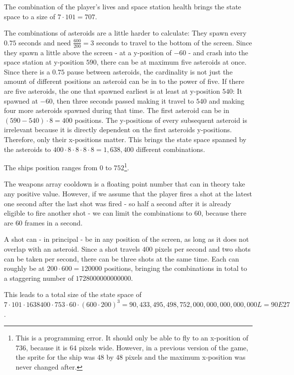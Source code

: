 \documentclass[a4paper,10pt]{article}
\begin{document}
The combination of the player's lives and space station health brings the state space to a size of $7 \cdot 101 = 707$.

The combinations of asteroids are a little harder to calculate: They spawn every $0.75$ seconds and need $\frac{600}{200} = 3$ seconds to travel to the bottom of the screen.
Since they spawn a little above the screen - at a y-position of $-60$ -  and crash into the space station at y-position $590$, there can be at maximum five asteroids at once.
Since there is a $0.75$ pause between asteroids, the cardinality is not just the amount of different positions an asteroid can be in to the power of five.
If there are five asteroids, the one that spawned earliest is at least at y-position $540$: It spawned at $-60$, then three seconds passed making it travel to $540$ and making four more asteroids spawned during that time.
The first asteroid can be in $(590-540)\cdot8 = 400$ positions.
The y-positions of every subsequent asteroid is irrelevant because it is directly dependent on the first asteroids y-positions.
Therefore, only their x-positions matter.
This brings the state space spanned by the asteroids to $400\cdot8\cdot8\cdot8\cdot8 = 1,638,400$ different combinations.

The ships position ranges from $0$ to $752$\footnote{This is a programming error. It should only be able to fly to an x-position of $736$, because it is $64$ pixels wide. However, in a previous version of the game, the sprite for the ship was $48$ by $48$ pixels and the maximum x-position was never changed after.}.

The weapons array cooldown is a floating point number that can in theory take any positive value.
However, if we assume that the player fires a shot at the latest one second after the last shot was fired - so half a second after it is already eligible to fire another shot - we can limit the combinations to $60$, because there are $60$ frames in a second.

A shot can - in principal - be in any position of the screen, as long as it does not overlap with an asteroid.
Since a shot travels $400$ pixels per second and two shots can be taken per second, there can be three shots at the same time.
Each can roughly be at $200 \cdot 600 = 120000$ positions, bringing the combinations in total to a staggering number of $1728000000000000$.

This leads to a total size of the state space of $7\cdot101\cdot1638400\cdot753\cdot60\cdot(600\cdot200)^3 = 90,433,495,498,752,000,000,000,000,000L = 90E27$.
\end{document}
